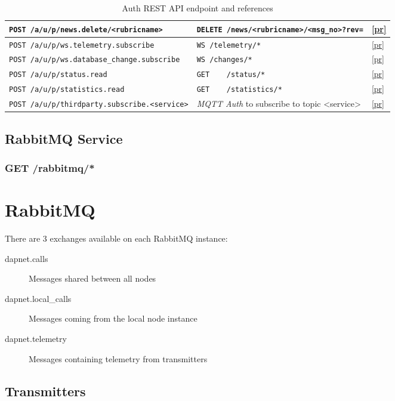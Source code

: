\begin{table}[htbp]
\begin{tabular}{|l|l|l|}
    \verb|POST /a/u/p/news.delete/<rubricname>| & \verb|DELETE /news/<rubricname>/<msg_no>?rev=| & \ref{pr} \\ \hline
    \hline
    \verb|POST /a/u/p/ws.telemetry.subscribe|       & \verb|WS /telemetry/*| & \ref{pr} \\ 
    \verb|POST /a/u/p/ws.database_change.subscribe| & \verb|WS /changes/*|   & \ref{pr} \\ \hline
    \hline    
    \verb|POST /a/u/p/status.read|     & \verb|GET    /status/*|     & \ref{pr} \\ \hline
    \verb|POST /a/u/p/statistics.read| & \verb|GET    /statistics/*| & \ref{pr} \\ \hline
    \hline
    \verb|POST /a/u/p/thirdparty.subscribe.<service>| & \textit{MQTT Auth} to subscribe to topic <service> & \ref{pr} \\
    \hline
  \end{tabular}
  \caption{Auth REST API endpoint and references}
\end{table}

\newpage

\subsection{RabbitMQ Service}
\label{protocoldef:RabbitMQ}

\subsubsection{GET /rabbitmq/*}


\section{RabbitMQ}
\label{protocoldef:RabbitMQ}
There are 3 exchanges available on each RabbitMQ instance:
\begin{description}
\item[dapnet.calls] Messages shared between all nodes
\item[dapnet.local\_calls] Messages coming from the local node instance
\item[dapnet.telemetry] Messages containing telemetry from transmitters
\end{description}


\subsection{Transmitters}
\label{protocoldef:RabbitMQ:Transmitters}


